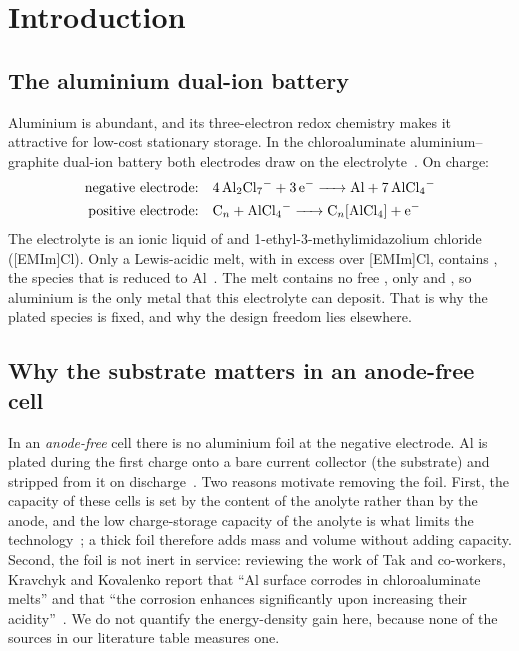 \section{Introduction}

\subsection{The aluminium dual-ion battery}
Aluminium is abundant, and its three-electron redox chemistry makes it attractive for low-cost stationary storage. In the chloroaluminate aluminium--graphite dual-ion battery both electrodes draw on the electrolyte~\citep{Kravchyk2020b,Kravchyk2020}. On charge:
\begin{align}
\text{negative electrode:}\quad & \ce{4 Al2Cl7- + 3 e- -> Al + 7 AlCl4-} \label{eq:neg}\\
\text{positive electrode:}\quad & \ce{C_n + AlCl4- -> C_n[AlCl4] + e-} \label{eq:pos}
\end{align}
The electrolyte is an ionic liquid of  and 1-ethyl-3-methylimidazolium chloride ([EMIm]Cl). Only a Lewis-acidic melt, with  in excess over [EMIm]Cl, contains , the species that is reduced to Al~\citep{Kravchyk2020b}. The melt contains no free , only  and , so aluminium is the only metal that this electrolyte can deposit. That is why the plated species is fixed, and why the design freedom lies elsewhere.

\subsection{Why the substrate matters in an anode-free cell}
In an \emph{anode-free} cell there is no aluminium foil at the negative electrode. Al is plated during the first charge onto a bare current collector (the substrate) and stripped from it on discharge~\citep{WangL2021}. Two reasons motivate removing the foil. First, the capacity of these cells is set by the  content of the anolyte rather than by the anode, and the low charge-storage capacity of the anolyte is what limits the technology~\citep{Kravchyk2020}; a thick foil therefore adds mass and volume without adding capacity. Second, the foil is not inert in service: reviewing the work of Tak and co-workers, Kravchyk and Kovalenko report that ``Al surface corrodes in chloroaluminate melts'' and that ``the corrosion enhances significantly upon increasing their acidity''~\citep{Kravchyk2020b}. We do not quantify the energy-density gain here, because none of the sources in our literature table measures one.

